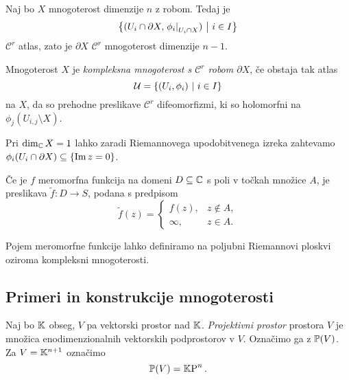 \begin{opomba}
Naj bo $X$ mnogoterost dimenzije $n$ z robom. Tedaj je
\[
\setb{(U_i \cap \partial X, \eval{\phi_i}{U_i \cap X}{})}{i \in I}
\]
$\mathcal{C}^r$ atlas, zato je $\partial X$ $\mathcal{C}^r$
mnogoterost dimenzije $n-1$.
\end{opomba}

\begin{definicija}
Mnogoterost $X$ je \emph{kompleksna mnogoterost s $\mathcal{C}^r$
robom $\partial X$}, če obstaja tak atlas
\[
\mathcal{U} = \setb{(U_i, \phi_i)}{i \in I}
\]
na $X$, da so prehodne preslikave $\mathcal{C}^r$ difeomorfizmi, ki
so holomorfni na $\phi_j(U_{i,j} \setminus X)$.
\end{definicija}

\begin{opomba}
Pri $\dim_\C X = 1$ lahko zaradi Riemannovega upodobitvenega izreka
zahtevamo $\phi_i(U_i \cap \partial X) \subseteq \set{\Im z = 0}$.
\end{opomba}

\begin{trditev}
Če je $f$ meromorfna funkcija na domeni $D \subseteq \C$ s poli v
točkah množice $A$, je preslikava $\widetilde{f} \colon D \to S$,
podana s predpisom
\[
\widetilde{f}(z) = \begin{cases}
f(z), & z \not \in A,
\\
\infty, & z \in A.
\end{cases}
\]
\end{trditev}

\begin{opomba}
Pojem meromorfne funkcije lahko definiramo na poljubni Riemannovi
ploskvi oziroma kompleksni mnogoterosti.
\end{opomba}

\newpage

\subsection{Primeri in konstrukcije mnogoterosti}

\begin{definicija}
Naj bo $\K$ obseg, $V$ pa vektorski prostor nad $\K$.
\emph{Projektivni prostor} prostora $V$
je množica enodimenzionalnih vektorskih podprostorov v $V$.
Označimo ga z $\P(V)$. Za $V = \K^{n+1}$ označimo
\[
\P(V) = \proj{\K}{n}.
\]
\end{definicija}


